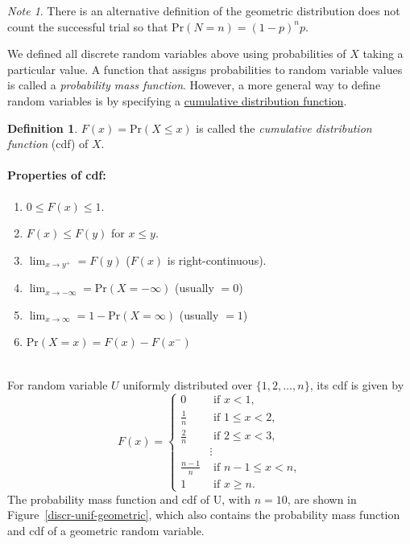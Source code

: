 \documentclass[11pt]{article}\usepackage[]{graphicx}\usepackage[]{color}
\numberwithin{algorithm}{section}
\newcommand{\prob}[1]{\ensuremath{\text{Pr}\left(#1 \right)}}
\theoremstyle{remark}
\newtheorem*{mynote}{Note}
\theoremstyle{definition}
\newtheorem*{define}{Definition}
\newenvironment{example}[1]{\begin{trivlist}
\item[\hskip \labelsep {\bfseries Example}: \underline{#1}]\ \\}{\end{trivlist}}
\begin{document}
\begin{mynote}
  There is an alternative definition of the geometric distribution does not count the successful trial so 
  that $\prob{N=n} = (1-p)^np$.
\end{mynote}

We defined all discrete random variables above using probabilities of $X$ taking a particular value. A function
that assigns probabilities to random variable values is called a \textit{probability mass function}. However, a more
general way to define random variables is by specifying a \underline{cumulative distribution function}.


\begin{define}
  $F(x) = \prob{X \le x}$ is called the \textit{cumulative distribution function} (cdf) of $X$.
\end{define}

\paragraph{Properties of cdf:}
\begin{enumerate}
\item $0 \le F(x) \le 1$.
\item $F(x) \le F(y)$ for $x \le y$.
\item $\lim_{x \rightarrow y^{+}} = F(y)$ ($F(x)$ is right-continuous).
\item $\lim_{x \rightarrow -\infty} = \prob{X=-\infty}$ (usually $=0$)
\item $\lim_{x \rightarrow \infty} = 1-\prob{X=\infty}$ (usually $=1$)
\item $\prob{X=x} = F(x) - F(x^-)$
\end{enumerate}

\begin{example}{Discrete uniform random variable}
  For random variable $U$ uniformly distributed over $\{1,2,\dots,n\}$, its cdf is given by
  \[
  F(x) = 
  \begin{cases}
  0 &\text{ if } x < 1,\\
  \frac{1}{n} &\text { if } 1 \le x < 2,\\
  \frac{2}{n} &\text { if } 2 \le x < 3,\\
  &\vdots\\
  \frac{n-1}{n} &\text { if } n-1 \le x < n,\\
  1 &\text{ if } x \ge n.
  \end{cases} 
  \]
  The probability mass function and cdf of U, with $n=10$, are shown in Figure~\ref{discr-unif-geometric}, which also contains the probability mass function and cdf of a geometric random variable.
\end{example}
\end{document}
